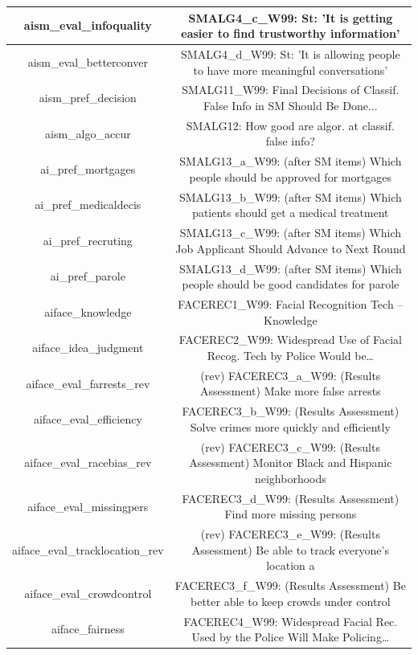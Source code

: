 {\begin{tabular}{c | c}
  aism\_eval\_infoquality & SMALG4\_c\_W99: St: 'It is getting easier to find trustworthy information' \\
  \hline
  aism\_eval\_betterconver & SMALG4\_d\_W99: St: 'It is allowing people to have more meaningful conversations' \\
  \hline
  aism\_pref\_decision & SMALG11\_W99: Final Decisions of Classif. False Info in SM Should Be Done... \\
  \hline
  aism\_algo\_accur & SMALG12: How good are algor. at classif. false info? \\
  \hline
  ai\_pref\_mortgages & SMALG13\_a\_W99: (after SM items) Which people should be approved for mortgages \\
  \hline
  ai\_pref\_medicaldecis & SMALG13\_b\_W99: (after SM items) Which patients should get a medical treatment \\
  \hline
  ai\_pref\_recruting & SMALG13\_c\_W99: (after SM items) Which Job Applicant Should Advance to Next Round \\
  \hline
  ai\_pref\_parole & SMALG13\_d\_W99: (after SM items) Which people should be good candidates for parole \\
  \hline
  aiface\_knowledge & FACEREC1\_W99: Facial Recognition Tech – Knowledge \\
  \hline
  aiface\_idea\_judgment & FACEREC2\_W99: Widespread Use of Facial Recog. Tech by Police Would be… \\
  \hline
  aiface\_eval\_farrests\_rev & (rev) FACEREC3\_a\_W99: (Results Assessment) Make more false arrests \\
  \hline
  aiface\_eval\_efficiency & FACEREC3\_b\_W99: (Results Assessment) Solve crimes more quickly and efficiently \\
  \hline
  aiface\_eval\_racebias\_rev & (rev) FACEREC3\_c\_W99: (Results Assessment) Monitor Black and Hispanic neighborhoods \\
  \hline
  aiface\_eval\_missingpers & FACEREC3\_d\_W99: (Results Assessment) Find more missing persons \\
  \hline
  aiface\_eval\_tracklocation\_rev & (rev) FACEREC3\_e\_W99: (Results Assessment) Be able to track everyone’s location a \\
  \hline
  aiface\_eval\_crowdcontrol & FACEREC3\_f\_W99: (Results Assessment) Be better able to keep crowds under control \\
  \hline
  aiface\_fairness & FACEREC4\_W99: Widespread Facial Rec. Used by the Police Will Make Policing… \\

\end{tabular}}
